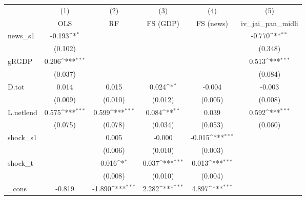 {
\def\sym#1{\ifmmode^{#1}\else\(^{#1}\)\fi}
\begin{tabular}{l*{5}{c}}
\toprule
            &\multicolumn{1}{c}{(1)}&\multicolumn{1}{c}{(2)}&\multicolumn{1}{c}{(3)}&\multicolumn{1}{c}{(4)}&\multicolumn{1}{c}{(5)}\\
            &\multicolumn{1}{c}{OLS}&\multicolumn{1}{c}{RF}&\multicolumn{1}{c}{FS (GDP)}&\multicolumn{1}{c}{FS (news)}&\multicolumn{1}{c}{iv\_jai\_pan\_midli}\\
\midrule
news\_s1     &      -0.193\sym{*}  &                     &                     &                     &      -0.770\sym{**} \\
            &     (0.102)         &                     &                     &                     &     (0.348)         \\
\addlinespace
gRGDP       &       0.206\sym{***}&                     &                     &                     &       0.513\sym{***}\\
            &     (0.037)         &                     &                     &                     &     (0.084)         \\
\addlinespace
D.tot       &       0.014         &       0.015         &       0.024\sym{*}  &      -0.004         &      -0.003         \\
            &     (0.009)         &     (0.010)         &     (0.012)         &     (0.005)         &     (0.008)         \\
\addlinespace
L.netlend   &       0.575\sym{***}&       0.599\sym{***}&       0.084\sym{**} &       0.039         &       0.592\sym{***}\\
            &     (0.075)         &     (0.078)         &     (0.034)         &     (0.053)         &     (0.060)         \\
\addlinespace
shock\_s1    &                     &       0.005         &      -0.000         &      -0.015\sym{***}&                     \\
            &                     &     (0.006)         &     (0.010)         &     (0.003)         &                     \\
\addlinespace
shock\_t     &                     &       0.016\sym{*}  &       0.037\sym{***}&       0.013\sym{***}&                     \\
            &                     &     (0.008)         &     (0.010)         &     (0.004)         &                     \\
\addlinespace
\_cons      &      -0.819         &      -1.890\sym{***}&       2.282\sym{***}&       4.897\sym{***}&                     \\

\end{tabular}}
